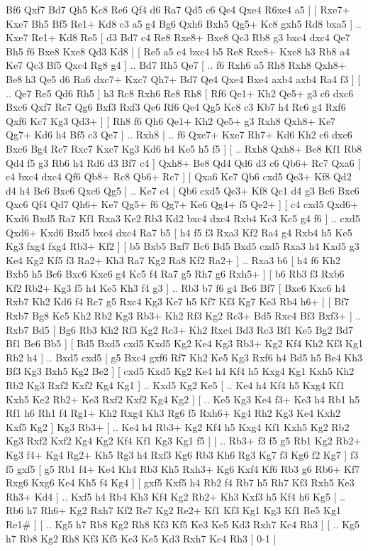 Bf6  Qxf7 Bd7  Qh5 Kc8  Re6 Qf4  d6 Ra7  Qd5 c6  Qe4 Qxe4  R6xe4 a5   ]  [  Rxe7+ Kxe7  Bh5 Bf5  Re1+ Kd8  c3 a5  g4 Bg6  Qxh6 Bxh5  Qg5+ Kc8  gxh5 Rd8  bxa5   ] .. Kxe7    Re1+   Kd8    Re5 [  d3 Bd7  c4 Re8  Rxe8+ Bxe8  Qc3 Rb8  g3 bxc4  dxc4 Qe7  Bh5 f6  Bxe8 Kxe8  Qd3 Kd8   ]  [  Re5 a5  c4 bxc4  b5 Re8  Rxe8+ Kxe8  h3 Rb8  a4 Ke7  Qc3 Bf5  Qxc4 Rg8  g4   ] .. Bd7    Rh5   Qe7 [ .. f6  Rxh6 a5  Rh8 Rxh8  Qxh8+ Be8  h3 Qe5  d6 Ra6  dxc7+ Kxc7  Qh7+ Bd7  Qe4 Qxe4  Bxe4 axb4  axb4 Ra4  f3   ]  [ .. Qe7  Re5 Qd6  Rh5   ]  h3   Rc8    Rxh6   Re8    Rh8 [  Rf6 Qe1+  Kh2 Qe5+  g3 c6  dxc6 Bxc6  Qxf7 Rc7  Qg6 Bxf3  Rxf3 Qe6  Rf6 Qe4  Qg5 Kc8  c3 Kb7  h4 Rc6  g4 Rxf6  Qxf6 Kc7  Kg3 Qd3+   ]  [  Rh8 f6  Qh6 Qe1+  Kh2 Qe5+  g3 Rxh8  Qxh8+ Ke7  Qg7+ Kd6  h4 Bf5  c3 Qe7   ] .. Rxh8 [ .. f6  Qxe7+ Kxe7  Rh7+ Kd6  Kh2 c6  dxc6 Bxc6  Bg4 Rc7  Rxc7 Kxc7  Kg3 Kd6  h4 Ke5  h5 f5   ]  [ .. Rxh8  Qxh8+ Be8  Kf1 Rb8  Qd4 f5  g3 Rb6  h4 Rd6  d3 Bf7  c4   ]  Qxh8+   Be8    Qd4   Qd6    d3   c6    Qb6+   Rc7    Qxa6 [  c4 bxc4  dxc4 Qf6  Qb8+ Rc8  Qb6+ Rc7   ]  [  Qxa6 Ke7  Qb6 cxd5  Qe3+ Kf8  Qd2 d4  h4 Bc6  Bxc6 Qxc6  Qg5   ] .. Ke7    c4 [  Qb6 cxd5  Qe3+ Kf8  Qc1 d4  g3 Bc6  Bxc6 Qxc6  Qf4 Qd7  Qh6+ Ke7  Qg5+ f6  Qg7+ Ke6  Qg4+ f5  Qe2+   ]  [  c4 cxd5  Qxd6+ Kxd6  Bxd5 Ra7  Kf1 Rxa3  Ke2 Rb3  Kd2 bxc4  dxc4 Rxb4  Kc3 Kc5  g4 f6   ] .. cxd5    Qxd6+   Kxd6   Bxd5   bxc4    dxc4   Ra7    b5 [  h4 f5  f3 Rxa3  Kf2 Ra4  g4 Rxb4  h5 Ke5  Kg3 fxg4  fxg4 Rb3+  Kf2   ]  [  b5 Bxb5  Bxf7 Bc6  Bd5 Bxd5  cxd5 Rxa3  h4 Kxd5  g3 Ke4  Kg2 Kf5  f3 Ra2+  Kh3 Ra7  Kg2 Ra8  Kf2 Ra2+   ] .. Rxa3    b6 [  h4 f6  Kh2 Bxb5  h5 Bc6  Bxc6 Kxc6  g4 Kc5  f4 Ra7  g5 Rh7  g6 Rxh5+   ]  [  b6 Rb3  f3 Rxb6  Kf2 Rb2+  Kg3 f5  h4 Ke5  Kh3 f4  g3   ] .. Rb3    b7   f6    g4   Bc6    Bf7 [  Bxc6 Kxc6  h4 Rxb7  Kh2 Kd6  f4 Rc7  g5 Rxc4  Kg3 Ke7  h5 Kf7  Kf3 Kg7  Ke3 Rb4  h6+   ]  [  Bf7 Rxb7  Bg8 Kc5  Kh2 Rb2  Kg3 Rb3+  Kh2 Rf3  Kg2 Rc3+  Bd5 Rxc4  Bf3 Bxf3+   ] .. Rxb7    Bd5 [  Bg6 Rb3  Kh2 Rf3  Kg2 Rc3+  Kh2 Rxc4  Bd3 Rc3  Bf1 Ke5  Bg2 Bd7  Bf1 Be6  Bb5   ]  [  Bd5 Bxd5  cxd5 Kxd5  Kg2 Ke4  Kg3 Rb3+  Kg2 Kf4  Kh2 Kf3  Kg1 Rb2  h4   ] .. Bxd5    cxd5 [  g5 Bxc4  gxf6 Rf7  Kh2 Ke5  Kg3 Rxf6  h4 Bd5  h5 Be4  Kh3 Bf3  Kg3 Bxh5  Kg2 Be2   ]  [  cxd5 Kxd5  Kg2 Ke4  h4 Kf4  h5 Kxg4  Kg1 Kxh5  Kh2 Rb2  Kg3 Rxf2  Kxf2 Kg4  Kg1   ] .. Kxd5    Kg2   Ke5 [ .. Ke4  h4 Kf4  h5 Kxg4  Kf1 Kxh5  Ke2 Rb2+  Ke3 Rxf2  Kxf2 Kg4  Kg2   ]  [ .. Ke5  Kg3 Ke4  f3+ Ke3  h4 Rb1  h5 Rf1  h6 Rh1  f4 Rg1+  Kh2 Rxg4  Kh3 Rg6  f5 Rxh6+  Kg4 Rh2  Kg3 Ke4  Kxh2 Kxf5  Kg2   ]  Kg3   Rb3+ [ .. Ke4  h4 Rb3+  Kg2 Kf4  h5 Kxg4  Kf1 Kxh5  Kg2 Rb2  Kg3 Rxf2  Kxf2 Kg4  Kg2 Kf4  Kf1 Kg3  Kg1 f5   ]  [ .. Rb3+  f3 f5  g5 Rb1  Kg2 Rb2+  Kg3 f4+  Kg4 Rg2+  Kh5 Rg3  h4 Rxf3  Kg6 Rb3  Kh6 Rg3  Kg7 f3  Kg6 f2  Kg7   ]  f3   f5    gxf5 [  g5 Rb1  f4+ Ke4  Kh4 Rb3  Kh5 Rxh3+  Kg6 Kxf4  Kf6 Rb3  g6 Rb6+  Kf7 Rxg6  Kxg6 Ke4  Kh5 f4  Kg4   ]  [  gxf5 Kxf5  h4 Rb2  f4 Rb7  h5 Rh7  Kf3 Rxh5  Ke3 Rh3+  Kd4   ] .. Kxf5    h4   Rb4    Kh3   Kf4    Kg2   Rb2+    Kh3   Kxf3    h5  Kf4    h6   Kg5 [ .. Rb6  h7 Rh6+  Kg2 Rxh7  Kf2 Re7  Kg2 Re2+  Kf1 Kf3  Kg1 Kg3  Kf1 Re5  Kg1 Re1#   ]  [ .. Kg5  h7 Rb8  Kg2 Rh8  Kf3 Kf5  Ke3 Ke5  Kd3 Rxh7  Kc4 Rh3   ]  [ .. Kg5  h7 Rb8  Kg2 Rh8  Kf3 Kf5  Ke3 Ke5  Kd3 Rxh7  Kc4 Rh3   ] 0-1  |
